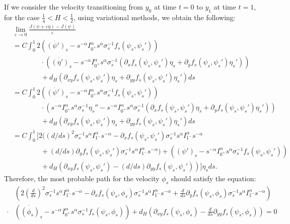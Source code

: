 \documentclass{article}
\theoremstyle{definition}  %
\theoremstyle{plain}  %
\begin{document}
If we consider the velocity transitioning from \( y_0 \) at time \( t = 0 \) to \( y_1 \) at time \( t = 1 \), for the case \( \frac{1}{4} < H < \frac{1}{2} \), using variational methods, we obtain the following:
\begin{align*}
& \lim_{\varepsilon\to 0}\frac{J(\psi+\varepsilon\eta)-J(\psi)}{\varepsilon}\\
&= C \int_0^1 2\left(\dot{(\psi')}_s- s^{-\alpha} I_{0^+}^\alpha s^{\alpha} \sigma_s^{-1} f_s(\psi_s,\psi_s') \right)\\
&\qquad\qquad\cdot\left( \dot{(\eta')}_s-s^{-\alpha}I_{0^+}^\alpha s^\alpha \sigma_s^{-1} (\partial_x f_s(\psi_s,\psi_s')\eta_s+ \partial_y f_s(\psi_s,\psi_s')\eta_s') \right)\\ &\qquad\qquad+d_H\left(\partial_{xy}f_s(\psi_s,\psi_s')\eta_s+ \partial_{yy}f_s(\psi_s,\psi_s')\eta_s' \right)ds\\
    &=C \int_0^1 2\left(\dot{(\psi')}_s- s^{-\alpha} I_{0^+}^\alpha s^{\alpha} \sigma_s^{-1} f_s(\psi_s,\psi_s') \right)\\ 
    &\qquad\qquad\cdot\left( s^{-\alpha}I_{0^+}^\alpha s^\alpha \sigma_s^{-1}\eta_s'' -s^{-\alpha}I_{0^+}^\alpha s^\alpha \sigma_s^{-1} (\partial_x f_s(\psi_s,\psi_s')\eta_s+ \partial_y f_s(\psi_s,\psi_s')\eta_s') \right)\\ &\qquad\qquad+d_H\left(\partial_{xy}f_s(\psi_s,\psi_s')\eta_s+ \partial_{yy}f_s(\psi_s,\psi_s')\eta_s' \right)ds\\
    &=C \int_0^1 [2 ((d/ds)^2\sigma_s^{-1} s^\alpha I^\alpha_{1^-}s^{-\alpha}- \partial_x f_s(\psi_s,\psi_s') \sigma_s^{-1} s^\alpha I^\alpha_{1^-}s^{-\alpha}\\
    &\qquad\qquad+ (d/ds)\partial_y f_s(\psi_s,\psi_s')\sigma_s^{-1} s^\alpha I^\alpha_{1^-}s^{-\alpha} )+\left(\dot{(\psi')}_s- s^{-\alpha} I_{0^+}^\alpha s^{\alpha} \sigma_s^{-1} f_s(\psi_s,\psi_s')\right)\\&\qquad\qquad+d_H(\partial_{xy}f_s(\psi_s,\psi_s')-(d/ds)\partial_{yy}f_s(\psi_s,\psi_s')) ]\eta_s ds . \end{align*}
Therefore, the most probable path for the velocity \( \phi_s \) should satisfy the equation:
\begin{align*}
   &\left( 2 \left( \frac{d}{ds} \right)^2 \sigma_s^{-1} s^\alpha I_{1^-}^\alpha s^{-\alpha} - \partial_x f_s(\psi_s, \phi_s) \sigma_s^{-1} s^\alpha I_{1^-}^\alpha s^{-\alpha} + \frac{d}{ds} \partial_y f_s(\psi_s, \phi_s) \sigma_s^{-1} s^\alpha I_{1^-}^\alpha s^{-\alpha}\right)\\
   \cdot &\left( \dot{(\phi_s)}_s - s^{-\alpha} I_{0^+}^\alpha s^{\alpha} \sigma_s^{-1} f_s(\psi_s, \phi_s) \right) + d_H \left( \partial_{xy} f_s(\psi_s, \phi_s) - \frac{d}{ds} \partial_{yy} f_s(\psi_s, \phi_s) \right) = 0
\end{align*}
\end{document}
